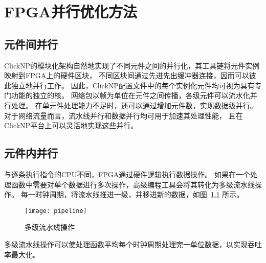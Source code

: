 \chapter{FPGA并行优化方法}
\section{元件间并行}
ClickNP的模块化架构自然地实现了不同元件之间的并行化，其工具链将元件实例映射到FPGA上的硬件区块，
不同区块间通过先进先出缓冲器连接，因而可以彼此独立地并行工作。
因此，ClickNP配置文件中的每个实例化元件均可视为具有专门功能的独立的核。
网络包以帧为单位在元件之间传播，各级元件可以流水化并行处理。
在单元件处理能力不足时，还可以通过增加元件数，实现数据级并行。
对于网络流量而言，流水线并行和数据并行均可用于加速其处理性能，
且在ClickNP平台上可以灵活地实现这些并行。

\section{元件内并行}
与逐条执行指令的CPU不同，FPGA通过硬件逻辑执行数据操作。
如果在一个处理函数中需要对单个数据进行多次操作，高级编程工具会将其转化为多级流水线操作。
每一时钟周期，将流水线推进一级，并移进新的数据，如图~\ref{fig:pipeline} 所示。
\begin{figure}[ht]
\centering
\texttt{[image: pipeline]}
\caption{多级流水线操作} \label{fig:pipeline}
\end{figure}

多级流水线操作可以使处理函数平均每个时钟周期处理完一单位数据，以实现吞吐率最大化。
